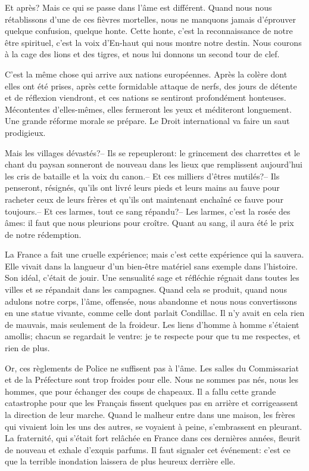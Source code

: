 \begin{chapter}{Et après?}
Mais ce qui se passe dans l'âme est différent. Quand nous nous
rétablissons d'une de ces fièvres mortelles, nous ne manquons jamais
d'éprouver quelque confusion, quelque honte. Cette honte, c'est la
reconnaissance de notre être spirituel, c'est la voix d'En-haut qui nous
montre notre destin. Nous courons à la cage des lions et des tigres, et
nous lui donnons un second tour de clef.

C'est la même chose qui arrive aux nations européennes. Après la colère
dont elles ont été prises, après cette formidable attaque de nerfs, des
jours de détente et de réflexion viendront, et ces nations se sentiront
profondément honteuses. Mécontentes d'elles-mêmes, elles fermeront les
yeux et méditeront longuement. Une grande réforme morale se prépare. Le
Droit international va faire un saut prodigieux.

Mais les villages dévastés?-- Ils se repeupleront: le grincement des
charrettes et le chant du paysan sonneront de nouveau dans les lieux que
remplissent aujourd'hui les cris de bataille et la voix du canon.-- Et
ces milliers d'êtres mutilés?-- Ils penseront, résignés, qu'ils ont livré
leurs pieds et leurs mains au fauve pour racheter ceux de leurs frères
et qu'ils ont maintenant enchaîné ce fauve pour toujours.-- Et ces
larmes, tout ce sang répandu?-- Les larmes, c'est la rosée des âmes: il
faut que nous pleurions pour croître. Quant au sang, il aura été le prix
de notre rédemption.

La France a fait une cruelle expérience; mais c'est cette expérience qui
la sauvera. Elle vivait dans la langueur d'un bien-être matériel sans
exemple dans l'histoire. Son idéal, c'était de jouir. Une sensualité
sage et réfléchie régnait dans toutes les villes et se répandait dans
les campagnes. Quand cela se produit, quand nous adulons notre corps,
l'âme, offensée, nous abandonne et nous nous convertissons en une statue
vivante, comme celle dont parlait Condillac. Il n'y avait en cela rien
de mauvais, mais seulement de la froideur. Les liens d'homme à homme
s'étaient amollis; chacun se regardait le ventre: je te respecte pour
que tu me respectes, et rien de plus.

Or, ces règlements de Police ne suffisent pas à l'âme. Les salles du
Commissariat et de la Préfecture sont trop froides pour elle. Nous ne
sommes pas nés, nous les hommes, que pour échanger des coups de
chapeaux. Il a fallu cette grande catastrophe pour que les Français
fissent quelques pas en arrière et corrigeassent la direction de leur
marche. Quand le malheur entre dans une maison, les frères qui vivaient
loin les uns des autres, se voyaient à peine, s'embrassent en pleurant.
La fraternité, qui s'était fort relâchée en France dans ces dernières
années, fleurit de nouveau et exhale d'exquis parfums. Il faut signaler
cet événement: c'est ce que la terrible inondation laissera de plus
heureux derrière elle.


\end{chapter}
